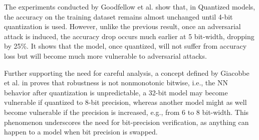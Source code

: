 The experiments conducted by Goodfellow et al. \cite{goodfellowExplainingHarnessingAdversarial2015} show that, in Quantized models, the accuracy on the training dataset remains almost unchanged until 4-bit quantization is used. However, unlike the previous result, once an adversarial attack is induced, the accuracy drop occurs much earlier at 5 bit-width, dropping by 25\%. It shows that the model, once quantized, will not suffer from accuracy loss but will become much more vulnerable to adversarial attacks.

Further supporting the need for careful analysis, a concept defined by Giacobbe et al. in \cite{giacobbe2020how} proves that robustness is not nonmonotonic bitwise, i.e., the NN behavior after quantization is unpredictable, a 32-bit model may become vulnerable if quantized to 8-bit precision, whereas another model might as well become vulnerable if the precision is increased, e.g., from 6 to 8 bit-width. This phenomenon underscores the need for bit-precision verification, as anything can happen to a model when bit precision is swapped.

